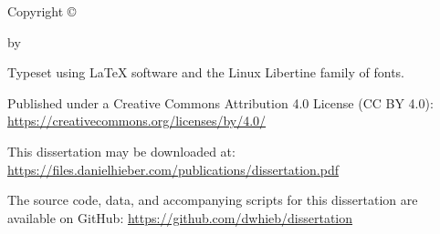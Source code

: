 \setcounter{page}{3}

\vspace*{\fill}

\begin{center}

  \thetitle

  \vspace{3em}

  Copyright {\copyright} \the\year

  by

  \theauthor

\end{center}

\vspace*{\fill}

\begin{flushleft}
\begin{singlespacing}

  \setlength{\parskip}{0.5em}

  Typeset using {\LaTeX} software and the Linux Libertine family of fonts.

  Published under a Creative Commons Attribution 4.0 License (CC BY 4.0): \href{https://creativecommons.org/licenses/by/4.0/}{https://creativecommons.org/licenses/by/4.0/}

  This dissertation may be downloaded at: \href{https://files.danielhieber.com/publications/dissertation.pdf}{https://files.danielhieber.com/publications/dissertation.pdf}

  The source code, data, and accompanying scripts for this dissertation are available on GitHub: \href{https://github.com/dwhieb/dissertation}{https://github.com/dwhieb/dissertation}

  \setlength{\parskip}{0em}

\end{singlespacing}
\end{flushleft}
